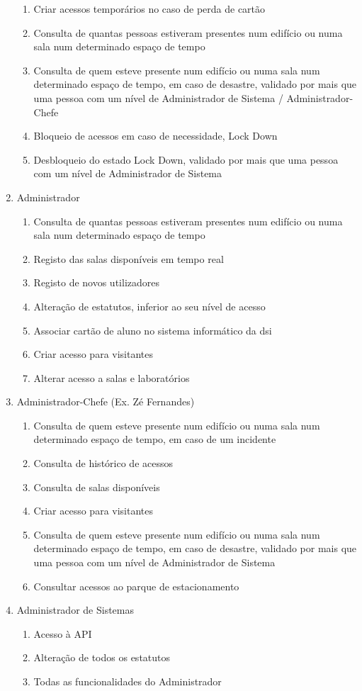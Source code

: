 \documentclass[a4paper]{report}
\begin{document}
\begin{enumerate}
\begin{enumerate}
    \item Criar acessos temporários no caso de perda de cartão
	\item Consulta de quantas pessoas estiveram presentes num edifício ou numa sala num determinado espaço de tempo
    \item Consulta de quem esteve presente num edifício ou numa sala num determinado espaço de tempo, em caso de desastre, validado por mais que uma pessoa com um nível de Administrador de Sistema / Administrador-Chefe
    \item Bloqueio de acessos em caso de necessidade, Lock Down
    \item Desbloqueio do estado Lock Down, validado por mais que uma pessoa com um nível de Administrador de Sistema
	\end{enumerate}
\item Administrador
	\begin{enumerate}
    \item Consulta de quantas pessoas estiveram presentes num edifício ou numa sala num determinado espaço de tempo
    \item Registo das salas disponíveis em tempo real
    \item Registo de novos utilizadores
    \item Alteração de estatutos, inferior ao seu nível de acesso
    \item Associar cartão de aluno no sistema informático da dsi
    \item Criar acesso para visitantes
    \item Alterar acesso a salas e laboratórios
    \end{enumerate}
\item Administrador-Chefe (Ex. Zé Fernandes)
	\begin{enumerate}
	\item Consulta de quem esteve presente num edifício ou numa sala num determinado espaço de tempo, em caso de um incidente
    \item Consulta de histórico de acessos
    \item Consulta de salas disponíveis
    \item Criar acesso para visitantes
    \item Consulta de quem esteve presente num edifício ou numa sala num determinado espaço de tempo, em caso de desastre, validado por mais que uma pessoa com um nível de Administrador de Sistema
    \item Consultar acessos ao parque de estacionamento
	\end{enumerate}
\item Administrador de Sistemas
	\begin{enumerate}
    \item Acesso à API
    \item Alteração de todos os estatutos
    \item Todas as funcionalidades do Administrador
    \end{enumerate}
\end{enumerate}
\end{document}
